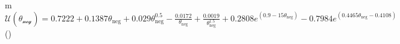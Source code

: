 \begin{table}[!htbp]
\begin{threeparttable}
\begin{tablenotes}
            \begin{footnotesize}
            \item[m] $\mathcal{U(\theta_\text{neg})} = 0.7222 + 0.1387\theta_\text{neg} + 0.029\theta_\text{neg}^{0.5} - \frac{0.0172}{\theta_\text{neg}} + \frac{0.0019}{\theta_\text{neg}^{1.5}} + 0.2808 e^{(0.9 - 15\theta_\text{neg})} - 0.7984 e^{(0.4465\theta_\text{neg} - 0.4108)}$\hspace*{\fill}(\theequation)\label{eq:lcoUocpNeg}\vfill
            \end{footnotesize}
        \end{tablenotes}
    \end{threeparttable}
\end{table}
